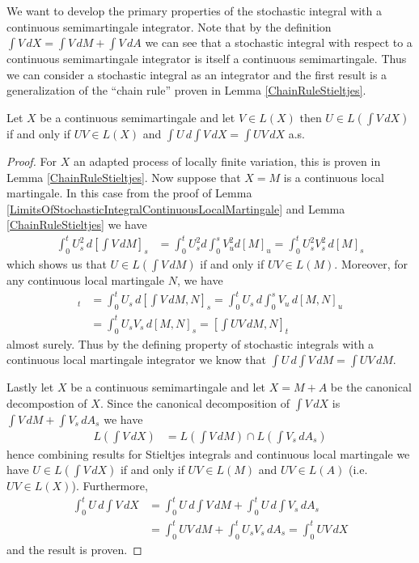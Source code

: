  We want to develop the primary properties of the stochastic integral with a continuous semimartingale integrator.  Note that by the definition $\int V \, dX = \int V \, dM + \int V \, dA$ we can see that a stochastic integral with respect to a continuous semimartingale integrator is itself a continuous semimartingale.  Thus we can consider a stochastic integral as an integrator and the first result is a generalization of the ``chain rule'' proven in Lemma \ref{ChainRuleStieltjes}.
\begin{lem}\label{ChainRuleContinuousSemimartingale}Let $X$ be a continuous semimartingale and let $V \in L(X)$ then $U \in L(\int V \, dX)$ if and only if $UV \in L(X)$ and $\int U \, d\int V \, dX = \int UV \, dX$ a.s.
\end{lem}
\begin{proof}
For $X$ an adapted process of locally finite variation, this is proven in Lemma \ref{ChainRuleStieltjes}.  Now suppose that $X =M$ is a continuous local martingale.  In this case from the proof of Lemma \ref{LimitsOfStochasticIntegralContinuousLocalMartingale} and Lemma \ref{ChainRuleStieltjes} we have 
\begin{align*}
\int_0^t U_s^2 \, d[\int V \, dM]_s &= \int_0^t U_s^2 d \int_0^s V_u^2 d[M]_u = \int_0^t U_s^2 V_s^2 \, d[M]_s
\end{align*}
which shows us that $U \in L(\int V \, dM)$ if and only if $UV \in L(M)$.  Moreover, for any continuous local martingale $N$, we have
\begin{align*}
[\int U \, d\int V \, dM, N]_t &= \int_0^t U_s \, d[\int V \, dM, N]_s = \int_0^t U_s \, d \int_0^s V_u \, d[M, N]_u \\
&= \int_0^t U_s V_s \, d[M,N]_s = [\int UV \, dM, N]_t
\end{align*}
almost surely.  Thus by the defining property of stochastic integrals with a continuous local martingale integrator we know that $\int U \, d\int V \, dM = \int UV \, dM$.

Lastly let $X$ be a continuous semimartingale and let $X = M + A$ be the canonical decompostion of $X$.  Since the canonical decomposition of $\int V \, dX$ is $\int V \, dM + \int V_s \, dA_s$ we have 
\begin{align*}
L(\int V \, dX) &= L(\int V \, dM) \cap L(\int V_s \, dA_s) 
\end{align*}
hence combining results for Stieltjes integrals and continuous local martingale we have $U \in L(\int V \, dX)$ if and only if $UV \in L(M)$ and $UV \in L(A)$ (i.e. $UV \in L(X)$).  Furthermore,
\begin{align*}
\int_0^t U \, d\int V \, dX &= \int_0^t U \, d\int V \, dM + \int_0^t U \, d \int V_s \, dA_s \\
&= \int_0^t UV \, dM + \int_0^t U_s V_s \, dA_s = \int_0^t UV \, dX
\end{align*}
and the result is proven.
\end{proof}

